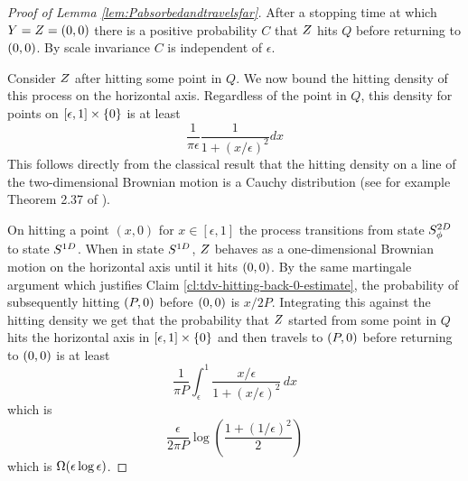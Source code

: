 {\begin{proof}[Proof of Lemma \ref{lem:Pabsorbedandtravelsfar}]
After a stopping time at which $Y = Z = (0,0)$ there is a positive probability $C$
that $Z$ hits $Q$ before returning to $(0,0)$.
By scale invariance $C$ is independent of $\epsilon$.

Consider $Z$ after hitting some point in $Q$.  We now
bound the hitting density of this process on the horizontal
axis.  Regardless of the point in $Q$, this density for points on
$[\epsilon,1] \times \{0\}$ is at least
\[
\frac{1}{\pi\epsilon} \frac{1}{1 + (x/\epsilon)^2} dx
\]
This follows directly from the classical result that the hitting density
on a line of the two-dimensional Brownian motion is a Cauchy distribution
(see for example Theorem 2.37 of \cite{mortens-peres}).

On hitting a point $(x,0)$ for $x \in [\epsilon, 1]$ the process
transitions from state $S^{2D}_{\phi}$ to state $S^{1D}$.
When in state $S^{1D}$, $Z$ behaves as a
one-dimensional Brownian motion on the horizontal axis until it hits
$(0,0)$.
By the same martingale argument which justifies
Claim \ref{cl:tdv-hitting-back-0-estimate}, the
probability of subsequently hitting $(P,0)$ before $(0,0)$ is $x/2P$.
Integrating this against the hitting density we get that the probability that
$Z$ started from some point in $Q$ hits the horizontal axis in $[\epsilon,1] \times \{0\}$
and then travels to $(P,0)$ before returning
to $(0,0)$ is at least
\[
\frac{1}{\pi P} \int_{\epsilon}^{1} \frac{x/\epsilon}{1 + (x/\epsilon)^2}
\, dx
\]
which is
\[
\frac{\epsilon}{2\pi P} \log\left(\frac{1 + (1/\epsilon)^2}{2}\right)
\]
which is $\Omega(\epsilon\log\epsilon)$.
\end{proof}
}
